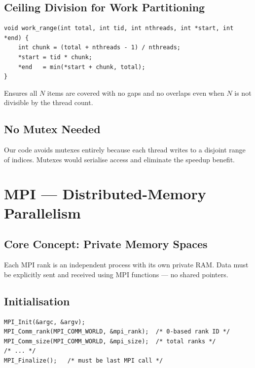 \documentclass[12pt,a4paper]{report}
\begin{document}
\section{Ceiling Division for Work Partitioning}

\begin{lstlisting}
void work_range(int total, int tid, int nthreads, int *start, int *end) {
    int chunk = (total + nthreads - 1) / nthreads;
    *start = tid * chunk;
    *end   = min(*start + chunk, total);
}
\end{lstlisting}

Ensures all $N$ items are covered with no gaps and no overlaps even when
$N$ is not divisible by the thread count.

\section{No Mutex Needed}

Our code avoids mutexes entirely because each thread writes to a disjoint
range of indices.  Mutexes would serialise access and eliminate the speedup
benefit.

\chapter{MPI — Distributed-Memory Parallelism}

\section{Core Concept: Private Memory Spaces}

Each MPI rank is an independent process with its own private RAM.  Data
must be explicitly sent and received using MPI functions — no shared pointers.

\section{Initialisation}

\begin{lstlisting}
MPI_Init(&argc, &argv);
MPI_Comm_rank(MPI_COMM_WORLD, &mpi_rank);  /* 0-based rank ID */
MPI_Comm_size(MPI_COMM_WORLD, &mpi_size);  /* total ranks */
/* ... */
MPI_Finalize();   /* must be last MPI call */
\end{lstlisting}
\end{document}
